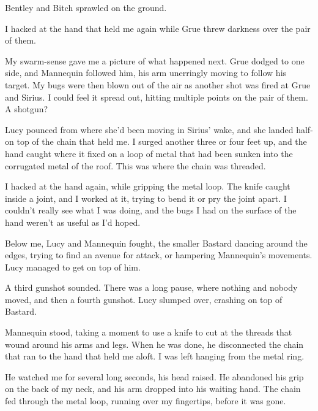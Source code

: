 Bentley and Bitch sprawled on the ground.



I hacked at the hand that held me again while Grue threw darkness over the pair of them.



My swarm-sense gave me a picture of what happened next.  Grue dodged to one side, and Mannequin followed him, his arm unerringly moving to follow his target.  My bugs were then blown out of the air as another shot was fired at Grue and Sirius.  I could feel it spread out, hitting multiple points on the pair of them.  A shotgun?



Lucy pounced from where she'd been moving in Sirius' wake, and she landed half-on top of the chain that held me.  I surged another three or four feet up, and the hand caught where it fixed on a loop of metal that had been sunken into the corrugated metal of the roof.  This was where the chain was threaded.



I hacked at the hand again, while gripping the metal loop.  The knife caught inside a joint, and I worked at it, trying to bend it or pry the joint apart.  I couldn't really see what I was doing, and the bugs I had on the surface of the hand weren't as useful as I'd hoped.



Below me, Lucy and Mannequin fought, the smaller Bastard dancing around the edges, trying to find an avenue for attack, or hampering Mannequin's movements.  Lucy managed to get on top of him.



A third gunshot sounded.  There was a long pause, where nothing and nobody moved, and then a fourth gunshot.  Lucy slumped over, crashing on top of Bastard.



Mannequin stood, taking a moment to use a knife to cut at the threads that wound around his arms and legs.  When he was done, he disconnected the chain that ran to the hand that held me aloft.  I was left hanging from the metal ring.



He watched me for several long seconds, his head raised.  He abandoned his grip on the back of my neck, and his arm dropped into his waiting hand.  The chain fed through the metal loop, running over my fingertips, before it was gone.



